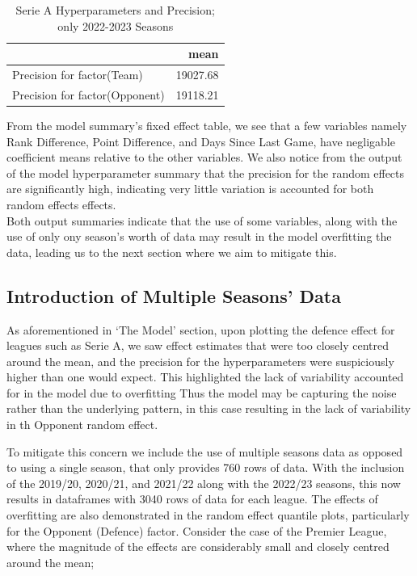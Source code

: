 \documentclass[
]{article}
\begin{document}
\begin{table}

\caption{\label{tab:exampleseriesummaryoutput}Serie A Hyperparameters and Precision; only 2022-2023 Seasons}
\centering
\begin{tabular}[t]{l|r}
\hline
  & mean\\
\hline
Precision for factor(Team) & 19027.68\\
\hline
Precision for factor(Opponent) & 19118.21\\
\hline
\end{tabular}
\end{table}

From the model summary's fixed effect table, we see that a few variables
namely Rank Difference, Point Difference, and Days Since Last Game, have
negligable coefficient means relative to the other variables. We also
notice from the output of the model hyperparameter summary that the
precision for the random effects are significantly high, indicating very
little variation is accounted for both random effects effects.\\
Both output summaries indicate that the use of some variables, along
with the use of only ony season's worth of data may result in the model
overfitting the data, leading us to the next section where we aim to
mitigate this.

\hypertarget{introduction-of-multiple-seasons-data}{%
\subsection{Introduction of Multiple Seasons'
Data}\label{introduction-of-multiple-seasons-data}}

As aforementioned in `The Model' section, upon plotting the defence
effect for leagues such as Serie A, we saw effect estimates that were
too closely centred around the mean, and the precision for the
hyperparameters were suspiciously higher than one would expect. This
highlighted the lack of variability accounted for in the model due to
overfitting Thus the model may be capturing the noise rather than the
underlying pattern, in this case resulting in the lack of variability in
th Opponent random effect.

To mitigate this concern we include the use of multiple seasons data as
opposed to using a single season, that only provides 760 rows of data.
With the inclusion of the 2019/20, 2020/21, and 2021/22 along with the
2022/23 seasons, this now results in dataframes with 3040 rows of data
for each league. The effects of overfitting are also demonstrated in the
random effect quantile plots, particularly for the Opponent (Defence)
factor. Consider the case of the Premier League, where the magnitude of
the effects are considerably small and closely centred around the mean;
\end{document}
